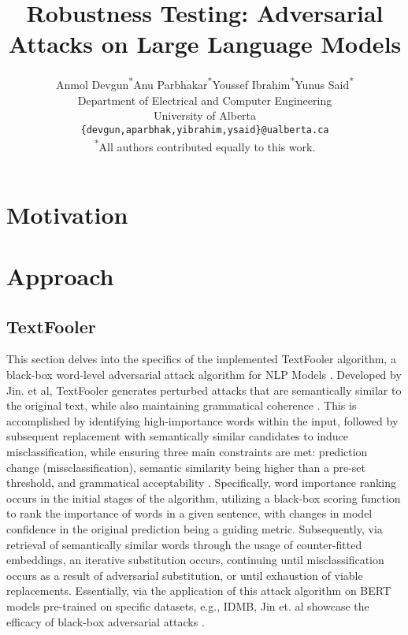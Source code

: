 \documentclass[conference]{IEEEtran}
\title{Robustness Testing: Adversarial Attacks on Large Language Models}
\author{
Anmol Devgun\textsuperscript{*}\quad Anu Parbhakar\textsuperscript{*}\quad Youssef Ibrahim\textsuperscript{*}\quad Yunus Said\textsuperscript{*} \\
Department of Electrical and Computer Engineering \\
University of Alberta \\
\texttt{\{devgun,aparbhak,yibrahim,ysaid\}@ualberta.ca} \\
\textsuperscript{*}All authors contributed equally to this work.
}
\begin{document}
\maketitle

\begin{abstract}
\end{abstract}

\section{Motivation}


\section{Approach}

\subsection{TextFooler}

This section delves into the specifics of the implemented TextFooler algorithm, a black-box word-level adversarial attack algorithm for NLP Models \cite{jin2020bertrobust}. Developed by Jin. et al, TextFooler generates perturbed attacks that are semantically similar to the original text, while also maintaining grammatical coherence \cite{jin2020bertrobust}. This is accomplished by identifying high-importance words within the input, followed by subsequent replacement with semantically similar candidates to induce misclassification, while ensuring three main constraints are met: prediction change (missclassification), semantic similarity being higher than a pre-set threshold, and grammatical acceptability \cite{jin2020bertrobust} \cite{textattack2020framework}. Specifically, word importance ranking occurs in the initial stages of the algorithm, utilizing a black-box scoring function to rank the importance of words in a given sentence, with changes in model confidence in the original prediction being a guiding metric. Subsequently, via retrieval of semantically similar words through the usage of counter-fitted embeddings, an iterative substitution occurs, continuing until misclassification occurs as a result of adversarial substitution, or until exhaustion of viable replacements. Essentially, via the application of this attack algorithm on BERT models pre-trained on specific datasets, e.g., IDMB, Jin et. al showcase the efficacy of black-box adversarial attacks \cite{jin2020bertrobust, mrksic2016counterfitting}.
\end{document}
